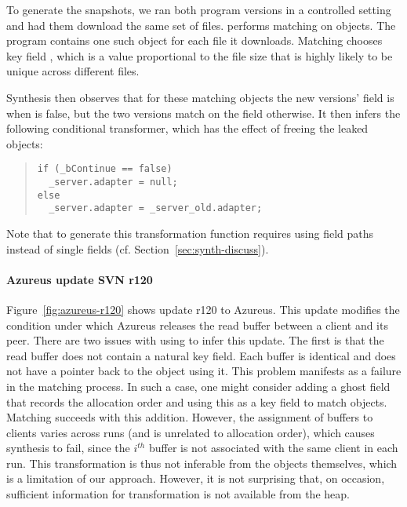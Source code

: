 To generate the snapshots, we ran both program versions in a
controlled setting and had them download the same set of files.
\TOS performs matching on
 objects.  The program contains one such
object for each file it downloads.  Matching chooses key
field , which is a value proportional to the file size
that is highly likely to be unique across different files.

Synthesis then observes that for
these matching objects the new versions'  field
is  when  is false, but the two
versions match on the  field otherwise.  
It then infers the following conditional transformer, which has the effect
of freeing the leaked objects:

\begin{samepage}
\begin{quote}
\vspace*{.5em}
\begin{lstlisting}
if (_bContinue == false)
  _server.adapter = null;
else
  _server.adapter = _server_old.adapter;
\end{lstlisting}
\vspace*{-.5em}
\end{quote}
\end{samepage}

\noindent 
Note that to generate this transformation function requires using
field paths instead of single fields (cf. Section~\ref{sec:synth-discuss}).

\paragraph*{Azureus update SVN r120}
Figure~\ref{fig:azureus-r120} shows update r120 to Azureus. This update modifies the condition under which
Azureus releases the read buffer between a client and its peer.  
There are two issues with using \TOS to infer this update.  The first
is that the read buffer does not contain a natural key field.  Each
buffer is identical and does not have a pointer back to the object
using it.  This problem manifests as a failure in the matching
process.
In such a case, one might consider adding a ghost field that records
the allocation order and using this as a key field to match objects.
Matching succeeds with this addition. However, the assignment of buffers
to clients varies across runs (and is unrelated to allocation order),
which causes synthesis to fail, since the $i^{th}$ buffer is not
associated with the same client in each run. 
This transformation is thus not inferable from the objects
themselves, which is a limitation of our approach. However, it is not
surprising that, on occasion, sufficient information for transformation
is not available from the heap.

